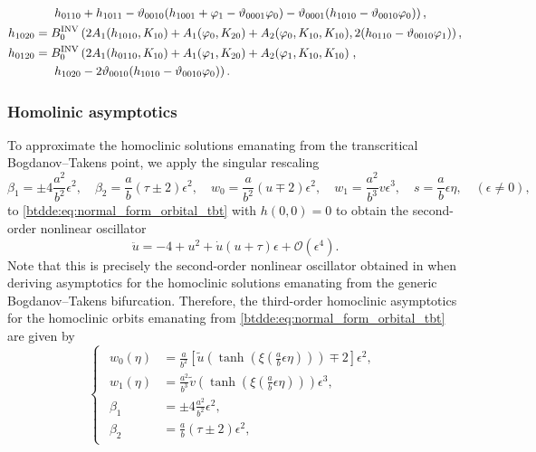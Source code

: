 \begin{equation}
\begin{aligned}
            & \left. h_{0110} + h_{1011} - \vartheta_{0010} (h_{1001} + \varphi_1 - \vartheta_{0001} \varphi_0) - \vartheta_{0001} (h_{1010} - \vartheta_{0010} \varphi_0) \right), \\
h_{1020} ={}& B^{\mathrm{INV}}_{0} \left(2 A_1(h_{1010},K_{10}) + A_1(\varphi_0,K_{20}) + A_2(\varphi_0,K_{10},K_{10}), 2(h_{0110} - \vartheta_{0010} \varphi_1) \right), \\
h_{0120} ={}& B^{\mathrm{INV}}_{0} \left(2 A_1(h_{0110},K_{10}) + A_1(\varphi_1,K_{20}) + A_2(\varphi_1,K_{10},K_{10})\right., \\
                         & \left.h_{1020} - 2 \vartheta_{0010} (h_{1010} - \vartheta_{0010} \varphi_0)\right). \\
\end{aligned}
\end{equation}

\subsubsection{Homolinic asymptotics}
\label{btdde:sec:transcritical_bt_homoclinic_asymptotics}
To approximate the homoclinic solutions emanating from the transcritical Bogdanov--Takens point,
we apply the singular rescaling
\begin{equation}
\label{btdde:eq:blowup}				
\beta_1 = \pm 4 \frac{a^2}{b^2} \epsilon^2, \quad 
\beta_2 = \frac a b \left(\tau \pm 2\right) \epsilon^2, \quad 
w_0 = \frac a{b^2} (u \mp 2) \epsilon^2, \quad
w_1 = \frac{a^2}{b^3} v \epsilon^3, \quad
s = \frac ab \epsilon \eta, \quad (\epsilon \neq 0),
\end{equation}
to \cref{btdde:eq:normal_form_orbital_tbt} with $h(0,0)=0$ to obtain the second-order
nonlinear oscillator
\begin{equation}
    \label{btdde:eq:second_order_nonlinear_oscillator}
    \ddot u = -4 + u^2 + \dot u \left( u + \tau \right)\epsilon + \mathcal O(\epsilon^4).
\end{equation}
Note that this is precisely the second-order nonlinear oscillator obtained in
\cite{Bosschaert@Interplay} when deriving asymptotics for the homoclinic
solutions emanating from the generic Bogdanov--Takens bifurcation.
Therefore, the third-order homoclinic asymptotics for the homoclinic orbits emanating from \cref{btdde:eq:normal_form_orbital_tbt}
are given by
\begin{equation}
\label{btdde:eq:third_order_predictor_LP_tau_tbt}
\begin{cases}
\begin{aligned}
w_0(\eta)  &= \frac{a}{b^2} \left[ \tilde {u}\left(\tanh\left(\xi\left(\frac{a}{b}\epsilon\eta\right)\right)\right) \mp 2 \right] \epsilon^2, \\
w_1(\eta)  &= \frac{a^2}{b^3} \tilde {v}\left(\tanh\left(\xi\left(\frac{a}{b}\epsilon\eta\right)\right)\right) \epsilon^3, \\
\beta_1 &= \pm 4 \frac{a^2}{b^2} \epsilon^2, \\
\beta_2 &= \frac a b \left(\tau \pm 2\right) \epsilon^2, \quad 
\end{aligned}
\end{cases}
\end{equation}
